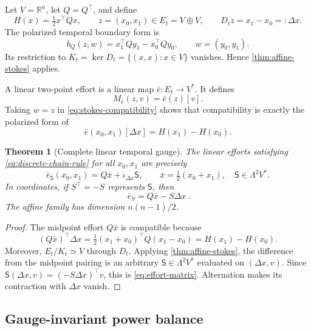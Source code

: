 \documentclass[11pt,a4paper]{article}
\newtheorem{theorem}{Theorem}[section]
\newcommand{\R}{\mathbb R}
\begin{document}
Let \(V=\R^n\), let \(Q=Q^\top\), and define
\[
 H(x)=\tfrac12x^\top Qx,\qquad
 z=(x_0,x_1)\in E_t=V\oplus V,\qquad
 D_tz=x_1-x_0=:\Delta x.
\]
The polarized temporal boundary form is
\begin{equation}\label{eq:temporal-boundary}
 b_Q(z,w)=x_1^\top Qy_1-x_0^\top Qy_0,
 \qquad w=(y_0,y_1).
\end{equation}
Its restriction to \(K_t=\ker D_t=\{(x,x):x\in V\}\) vanishes. Hence
\cref{thm:affine-stokes} applies.

A linear two-point effort is a linear map
\(\bar e:E_t\to V^*\). It defines
\[
 M_{\bar e}(z,v)=\bar e(z)[v].
\]
Taking \(w=z\) in \cref{eq:stokes-compatibility} shows that compatibility is
exactly the polarized form of
\begin{equation}\label{eq:discrete-chain-rule}
 \bar e(x_0,x_1)[\Delta x]=H(x_1)-H(x_0).
\end{equation}

\begin{theorem}[Complete linear temporal gauge]\label{thm:two-point-gauge}
The linear efforts satisfying \cref{eq:discrete-chain-rule} for all
\(x_0,x_1\) are precisely
\begin{equation}\label{eq:effort-intrinsic}
 \bar e_{\mathsf S}(x_0,x_1)
 =Q\bar x+\iota_{\Delta x}\mathsf S,
 \qquad
 \bar x=\tfrac12(x_0+x_1),\quad
 \mathsf S\in\Lambda^2V^*.
\end{equation}
In coordinates, if \(S^\top=-S\) represents \(\mathsf S\), then
\begin{equation}\label{eq:effort-matrix}
 \boxed{\ \bar e_S=Q\bar x-S\Delta x\ }.
\end{equation}
The affine family has dimension \(n(n-1)/2\).
\end{theorem}

\begin{proof}
The midpoint effort \(Q\bar x\) is compatible because
\[
 (Q\bar x)^\top\Delta x
 =\tfrac12(x_1+x_0)^\top Q(x_1-x_0)
 =H(x_1)-H(x_0).
\]
Moreover, \(E_t/K_t\simeq V\) through \(D_t\). Applying
\cref{thm:affine-stokes}, the difference from the midpoint pairing is an
arbitrary \(\mathsf S\in\Lambda^2V^*\) evaluated on
\((\Delta x,v)\). Since
\(\mathsf S(\Delta x,v)=(-S\Delta x)^\top v\), this is
\cref{eq:effort-matrix}. Alternation makes its contraction with
\(\Delta x\) vanish.
\end{proof}

\subsection{Gauge-invariant power balance}
\end{document}
